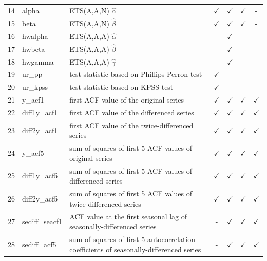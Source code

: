 \documentclass[11pt,a4paper,]{article}
\def\yes{$\checkmark$}
\begin{document}
\begin{table}[!htp]
\begin{tabular}{llp{}cccc}
14 & alpha          & ETS(A,A,N) $\hat\alpha$                                                                 & \yes  & \yes & \yes & -\\
15 & beta           & ETS(A,A,N) $\hat\beta$                                                                  & \yes  & \yes & \yes & - \\
16 & hwalpha        & ETS(A,A,A) $\hat\alpha$                                                                 & -     & \yes & - & -\\
17 & hwbeta         & ETS(A,A,A) $\hat\beta$                                                                  & -     & \yes & - & - \\
18 & hwgamma        & ETS(A,A,A) $\hat\gamma$                                                                 & -     & \yes & - &-\\
19 & ur\_pp         & test statistic based on Phillips-Perron test                                            & \yes  & - & - & - \\
20 & ur\_kpss       & test statistic based on KPSS test                                                       & \yes  & - & - & - \\
21 & y\_acf1        & first ACF value of the original series                                                  & \yes  & \yes & \yes & \yes\\
22 & diff1y\_acf1   & first ACF value of the differenced series                                               & \yes  & \yes & \yes & \yes\\
23 & diff2y\_acf1   & first ACF value of the twice-differenced series                                         & \yes  & \yes & \yes & \yes\\
24 & y\_acf5        & sum of squares of first 5 ACF values of original series                                 & \yes  & \yes & \yes & \yes\\
25 & diff1y\_acf5   & sum of squares of first 5 ACF values of differenced series                              & \yes  & \yes & \yes & \yes\\
26 & diff2y\_acf5   & sum of squares of first 5 ACF values of twice-differenced series                        & \yes  & \yes & \yes & \yes \\
27 & sediff\_seacf1 & ACF value at the first seasonal lag of seasonally-differenced series                    & -     & \yes & \yes & \yes\\
28 & sediff\_acf5   & sum of squares of first 5 autocorrelation coefficients of seasonally-differenced series & -     & \yes & \yes & \yes\\

\end{tabular}
\end{table}
\end{document}
